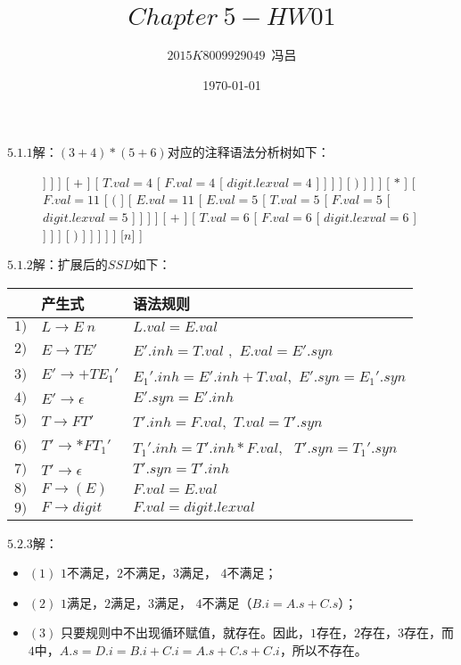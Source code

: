 \documentclass[UTF8,noindent]{ctexart}
\title{$Chapter\ 5-HW01$}
\author{$2015K8009929049$\ 冯吕}
\date{\today}
\begin{document}
\maketitle
{}
$5.1.1$解：$(3+4)*(5+6)$对应的注释语法分析树如下：
\begin{figure}[H]
  \centering
  \begin{forest}
	[
	  {$L.val = 77$}, [
		{$E.val = 77$}[
		  {$T.val = 77$}[
			[
			  {$T.val = 7$}
			  [
				{$F.val = 7$}
				[
				  {$($}
				]
				[
				  {$E.val = 7$}
				  [
					{$E.val = 3$}
					[
					  {$T.val = 3$}
					  [
						{$F.val = 3$}
						[
						  {$digit.lexval = 3$}
						]
					  ]
					]
				  ]
				  [
					{$+$}
				  ]
				  [
					{$T.val = 4$}
					[
					  {$F.val = 4$}
					  [
						{$digit.lexval = 4$}
					  ]
					]
				  ]
				]
				[
				{$)$}
				]
			  ]
			]
			[
			  {$*$}
			]
			[
			  {$F.val=11$}
			  [
				{$($}
			  ]
			  [
				{$E.val = 11$}
				[
				  {$E.val = 5$}
				  [
					{$T.val = 5$}
					[
					  {$F.val = 5$}
					  [
						{$digit.lexval = 5$}
					  ]
					]
				  ]
				]
				[
				  {$+$}
				]
				[
				  {$T.val = 6$}
				  [
					{$F.val = 6$}
					[
					  {$digit.lexval = 6$}
					]
				  ]
				]
			  ]
			  [
			  {$)$}
			  ]
			]
		  ]
		]
	  ]
	  [{$n$}]
	]
  \end{forest}
\end{figure}

$5.1.2$解：扩展后的$SSD$如下：
\begin{center}
  \begin{tabular}{|l|l|l|}
	\hline
	& 产生式& 语法规则\\
	\hline
  $1)$ & $L\rightarrow E\ n$ & $L.val = E.val$\\
  \hline
$2)$ & $E\rightarrow TE'$ & $E'.inh = T.val$ ,\ $E.val = E'. syn$ \\
\hline
$3)$ & $E'\rightarrow + TE_1'$ & $E_1'.inh = E'.inh + T.val$,\ $E'.syn = E_1'.syn$ \\
\hline
$4)$ & $E'\rightarrow \epsilon$ & $E'.syn = E'.inh$ \\
\hline
$5) $ & $T\rightarrow FT'$ & $T'.inh = F.val $,\ $T.val = T'.syn$\\
\hline 
$6)$ & $T'\rightarrow *FT_1'$ & $T_1'.inh = T'.inh * F.val$, \ $T'.syn = T_1'.syn$\\
\hline 
$7)$ & $T'\rightarrow \epsilon$ & $T'.syn = T'.inh$\\
\hline 
$8)$ & $F\rightarrow (E)$ & $F.val = E.val$\\
\hline 
$9)$ & $F\rightarrow digit$ & $F.val = digit.lexval$\\
\hline
  \end{tabular}
\end{center}

\newpage

$5.2.3$解：
\begin{itemize}
  \item 
$(1)$ $1$不满足，$2$不满足，$3$满足， $4$不满足；
\item
$(2)$ $1$满足，$2$满足，$3$满足， $4$不满足（$B.i = A.s + C.s$）；
\item $(3)$ 只要规则中不出现循环赋值，就存在。因此，$1$存在，$2$存在，$3$存在，而$4$中，$A.s = D.i = B.i + C.i = A.s+C.s+C.i$，所以不存在。
\end{itemize}
\end{document}
